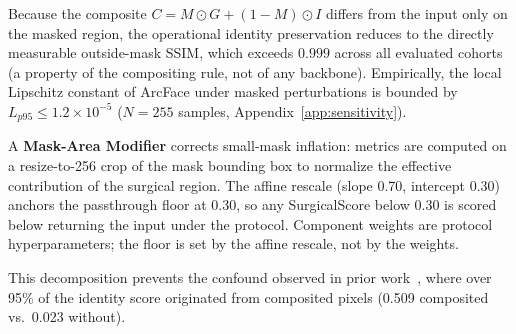 \documentclass{article}
\begin{document}
Because the composite $C = M \odot G + (1-M) \odot I$ differs from the input
only on the masked region, the operational identity preservation reduces to
the directly measurable outside-mask SSIM, which exceeds $0.999$ across all
evaluated cohorts (a property of the compositing rule, not of any backbone).
Empirically, the local Lipschitz constant of ArcFace under masked perturbations
is bounded by $L_{p95} \leq 1.2 \times 10^{-5}$ ($N{=}255$ samples,
Appendix~\ref{app:sensitivity}).

A \textbf{Mask-Area Modifier} corrects small-mask inflation: metrics are computed
on a resize-to-256 crop of the mask bounding box to normalize the effective
contribution of the surgical region. The affine rescale (slope 0.70, intercept 0.30) anchors the
passthrough floor at 0.30, so any SurgicalScore below 0.30 is scored below
returning the input under the protocol. Component weights are protocol hyperparameters; the floor is set by the affine rescale, not by the weights.

This decomposition prevents the confound observed in prior work~\citep{landmarkdiff_anon},
where over 95\% of the identity score originated from composited pixels
(0.509 composited vs.\ 0.023 without).
\end{document}
